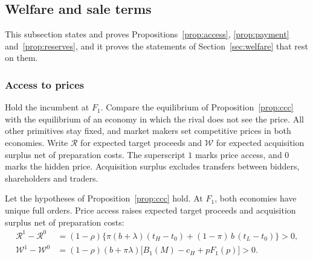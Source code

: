 \subsection{Welfare and sale terms}\label{app:welfare}

This subsection states and proves Propositions~\ref{prop:access}, \ref{prop:payment} and~\ref{prop:reserves}, and
it proves the statements of Section~\ref{sec:welfare} that rest on them.

\subsubsection*{Access to prices}

Hold the incumbent at \(F_1\). Compare the equilibrium of Proposition~\ref{prop:ccc} with the equilibrium of an
economy in which the rival does not see the price. All other primitives stay fixed, and market makers set
competitive prices in both economies. Write \(\mathcal R\) for expected target proceeds and \(\mathcal W\) for expected
acquisition surplus net of preparation costs. The superscript \(1\) marks price access, and \(0\) marks the hidden
price. Acquisition surplus excludes transfers between bidders, shareholders and traders.

\begin{proposition}\label{prop:access}
Let the hypotheses of Proposition~\ref{prop:ccc} hold. At \(F_1\), both economies have unique full orders. Price
access raises expected target proceeds and acquisition surplus net of preparation costs:
\[
\begin{aligned}
\mathcal R^1-\mathcal R^0&=(1-\rho)\bigl\{\pi(b+\lambda)(t_H-t_0)+(1-\pi)\,b\,(t_L-t_0)\bigr\}>0,\\
\mathcal W^1-\mathcal W^0&=(1-\rho)(b+\pi\lambda)\bigl[B_1(M)-c_H+pF_1(p)\bigr]>0.
\end{aligned}
\]
\end{proposition}

